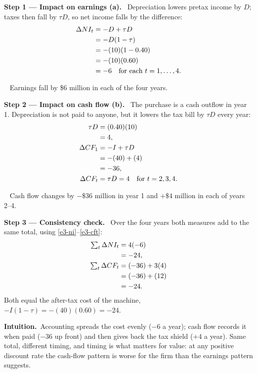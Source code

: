 \documentclass[11pt,a4paper]{article}
\newcommand{\step}[2]{\par\medskip\noindent\textbf{Step #1 --- #2.}~}
\newcommand{\intuition}{\par\medskip\noindent\textbf{Intuition.}~}
\newcommand{\answer}[1]{\par\smallskip\noindent\fbox{\textbf{Answer #1.}}~}
\begin{document}
\step{1}{Impact on earnings (a)}
Depreciation lowers pretax income by $D$; taxes then fall by $\tau D$, so net income falls by the
difference:
\begin{align}
  \Delta NI_t &= -D + \tau D \notag\\
  &= -D(1-\tau) \label{e3-ni}\\
  &= -(10)(1-0.40) \notag\\
  &= -(10)(0.60) \notag\\
  &= -6 \quad \text{for each } t = 1,\dots,4. \notag
\end{align}

\answer{(a)} Earnings fall by \$6 million in each of the four years.

\step{2}{Impact on cash flow (b)}
The purchase is a cash outflow in year 1. Depreciation is not paid to anyone, but it lowers the tax
bill by $\tau D$ every year:
\begin{align}
  \tau D &= (0.40)(10) \notag\\
  &= 4, \label{e3-ts}\\
  \Delta CF_1 &= -I + \tau D \notag\\
  &= -(40) + (4) \notag\\
  &= -36, \label{e3-cf1}\\
  \Delta CF_t &= \tau D = 4 \quad \text{for } t = 2,3,4. \label{e3-cft}
\end{align}

\answer{(b)} Cash flow changes by $-\$36$ million in year 1 and $+\$4$ million in each of years 2--4.

\step{3}{Consistency check}
Over the four years both measures add to the same total, using \eqref{e3-ni}--\eqref{e3-cft}:
\begin{align}
  \textstyle\sum_t \Delta NI_t &= 4(-6) \notag\\
  &= -24, \notag\\
  \textstyle\sum_t \Delta CF_t &= (-36) + 3(4) \notag\\
  &= (-36) + (12) \notag\\
  &= -24. \notag
\end{align}
Both equal the after-tax cost of the machine, $-I(1-\tau) = -(40)(0.60) = -24$.

\intuition Accounting spreads the cost evenly ($-6$ a year); cash flow records it when paid
($-36$ up front) and then gives back the tax shield ($+4$ a year). Same total, different timing,
and timing is what matters for value: at any positive discount rate the cash-flow pattern is worse
for the firm than the earnings pattern suggests.
\end{document}
